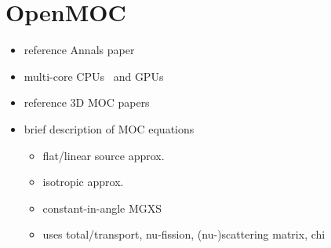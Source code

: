 \section{OpenMOC}
\label{sec:chap3-openmoc}

\begin{itemize}[noitemsep]
  \item reference Annals paper~\cite{boyd2014openmoc}
  \item multi-core CPUs~\cite{boyd2016parallel} and GPUs~\cite{boyd2013massively}
  \item reference 3D \ac{MOC} papers
  \item brief description of \ac{MOC} equations
  \begin{itemize}[noitemsep]
    \item flat/linear source approx.
    \item isotropic approx.
    \item constant-in-angle \ac{MGXS}
    \item uses total/transport, nu-fission, (nu-)scattering matrix, chi
  \end{itemize}
\end{itemize}

